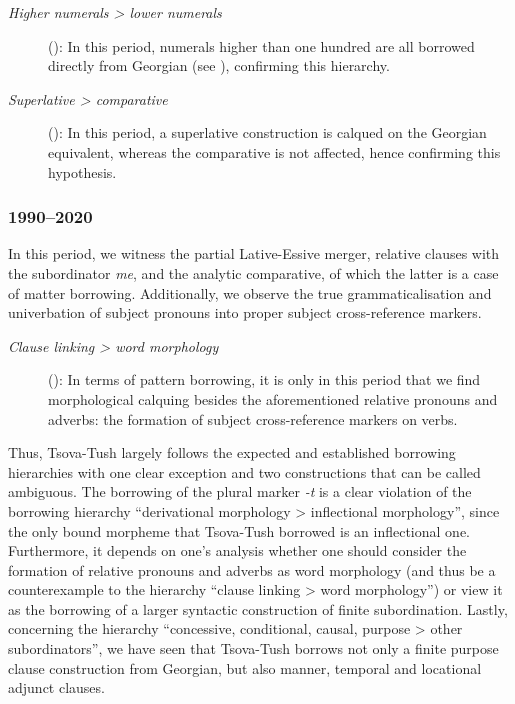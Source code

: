 \begin{description}
	\item [\emph{Higher numerals > lower numerals}] (\cite[213]{matras2011universals}): In this period, numerals higher than one hundred are all borrowed directly from Georgian (see ), confirming this hierarchy.
	\item [\emph{Superlative > comparative}] (\cite[220]{matras2011universals}): In this period, a superlative construction is calqued on the Georgian equivalent, whereas the comparative is not affected, hence confirming this hypothesis.
\end{description}



\subsubsection{1990--2020}

In this period, we witness the partial Lative-Essive merger, relative clauses with the subordinator \textit{me}, and the analytic comparative, of which the latter  is a case of matter borrowing. Additionally, we observe the true grammaticalisation and univerbation of subject pronouns into proper subject cross-reference markers.



\begin{description}
	\item[\emph{Clause linking > word morphology}] (\cite[224]{matras2011universals}): In terms of pattern borrowing, it is only in this period that we find morphological calquing besides the aforementioned relative pronouns and adverbs: the formation of subject cross-reference markers on verbs. 
\end{description}

Thus, Tsova-Tush largely follows the expected and established borrowing hierarchies with one clear exception and two constructions that can be called ambiguous. The borrowing of the plural marker \textit{-t} is a clear violation of the borrowing hierarchy ``derivational morphology > inflectional morphology'', since the only bound morpheme that Tsova-Tush borrowed is an inflectional one. Furthermore, it depends on one's analysis whether one should consider the formation of relative pronouns and adverbs as word morphology (and thus be a counterexample to the hierarchy ``clause linking > word morphology'') or view it as the borrowing of a larger syntactic construction of finite subordination. Lastly, concerning the hierarchy ``concessive, conditional, causal, purpose > other subordinators'', we have seen that Tsova-Tush borrows not only a finite purpose clause construction from Georgian, but also manner, temporal and locational adjunct clauses. 

